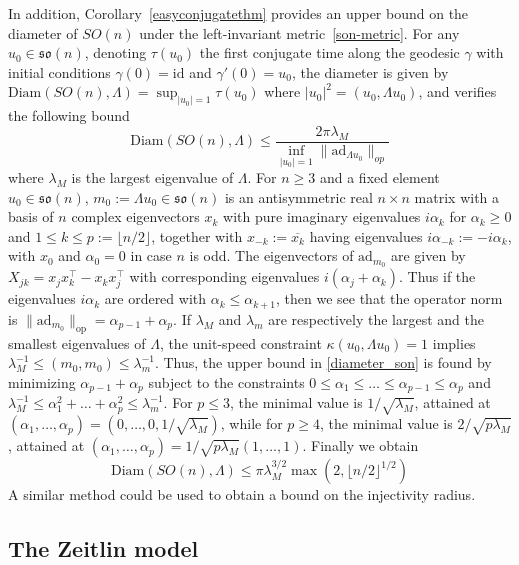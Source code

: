 \documentclass[oneside, 11pt]{amsart}
\numberwithin{equation}{section}
\newcommand{\ad}{\mathrm{ad}}
\newcommand{\id}{\mathrm{id}}
\begin{document}
In addition, Corollary~\ref{easyconjugatethm} provides an upper bound on the diameter of $SO(n)$ under the left-invariant metric~\eqref{son-metric}. For any $u_0\in\mathfrak{so}(n)$, denoting $\tau(u_0)$ the first conjugate time along the geodesic $\gamma$ with initial conditions $\gamma(0)=\id$ and $\gamma'(0)=u_0$, the diameter is given by $\mathrm{Diam}(SO(n),\Lambda)=\sup_{\lvert u_0\rvert =1}\tau(u_0)$ where $\lvert u_0\rvert^2=(u_0,\Lambda u_0)$, and verifies the following bound
\begin{equation}\label{diameter_son}
\mathrm{Diam}(SO(n),\Lambda)\leq \frac{2\pi\lambda_M}{\inf_{\lvert u_0\rvert=1}\|\ad_{\Lambda u_0}\|_{op}}
\end{equation}
where $\lambda_M$ is the largest eigenvalue of $\Lambda$.
For $n\ge 3$ and a fixed element $u_0\in\mathfrak{so}(n)$, $m_0:=\Lambda u_0\in\mathfrak{so}(n)$ is an antisymmetric real $n\times n$ matrix with a basis of $n$ complex eigenvectors $x_k$ with pure imaginary eigenvalues $ i\alpha_k$ for $\alpha_k\ge 0$ and $1\le k\le p:=\lfloor n/2\rfloor$, together with $x_{-k}:=\overline{x_k}$ having eigenvalues $i\alpha_{-k}:=-i\alpha_k$, with $x_0$ and $\alpha_0=0$ in case $n$ is odd. The eigenvectors of $\ad_{m_0}$ are given by $X_{jk} = x_jx_k^\top - x_kx_j^\top$ with corresponding eigenvalues $i(\alpha_j+\alpha_k)$.  
Thus if the eigenvalues $i\alpha_k$ are ordered with $\alpha_k\le \alpha_{k+1}$, then we see that the operator norm is $\lVert \ad_{m_0}\rVert_{\text{op}} = \alpha_{p-1}+\alpha_p$. 
If $\lambda_M$ and $\lambda_m$ are respectively the largest and the smallest eigenvalues of $\Lambda$, the unit-speed constraint $\kappa(u_0,\Lambda u_0) = 1$ implies $\lambda_M^{-1} \le  (m_0,m_0) \le \lambda_m^{-1}$. Thus, the upper bound in \eqref{diameter_son} is found by minimizing $\alpha_{p-1}+\alpha_p$ subject to the constraints $0\le\alpha_1\le\hdots\le \alpha_{p-1}\le \alpha_p$ and $\lambda_M^{-1}\le\alpha_1^2+\hdots+\alpha_p^2\leq \lambda_m^{-1}$. For $p\leq 3$, the minimal value is $1/\sqrt{\lambda_M}$, attained at $(\alpha_1,\hdots,\alpha_p)=(0,\hdots,0,1/\sqrt{\lambda_M})$, while for $p\geq 4$, the minimal value is $2/\sqrt{p\lambda_M}$, attained at $(\alpha_1,\hdots,\alpha_p)=1/\sqrt{p\lambda_M}(1,\hdots,1)$.  
Finally we obtain
$$\mathrm{Diam}(SO(n),\Lambda)\leq \pi\lambda_M^{3/2}\max(2, \lfloor n/2\rfloor^{1/2})$$
A similar method could be used to obtain a bound on the injectivity radius.
 
  


\subsection{The Zeitlin model}\label{zeitlin}
\end{document}
